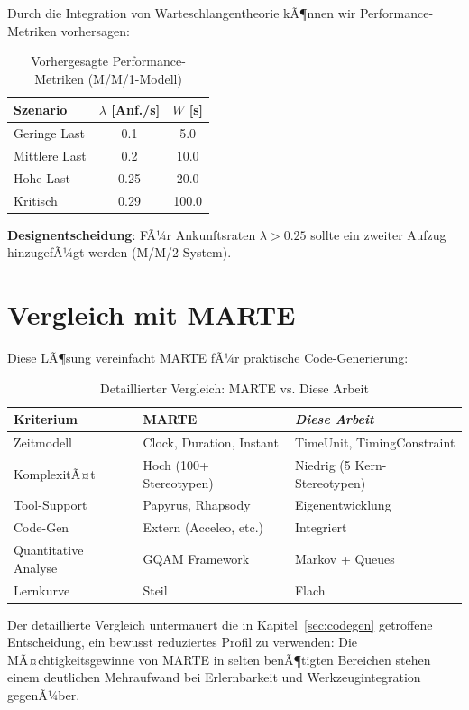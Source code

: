 ﻿\documentclass[a4paper,12pt]{report}
\theoremstyle{definition}
\begin{document}
Durch die Integration von Warteschlangentheorie kÃ¶nnen wir Performance-Metriken vorhersagen:

\begin{table}[h]
	\centering
	\begin{tabular}{@{}lcc@{}}
		\toprule
		\textbf{Szenario} & \textbf{$\lambda$ [Anf./s]} & \textbf{$W$ [s]} \\
		\midrule
		Geringe Last & 0.1 & 5.0 \\
		Mittlere Last & 0.2 & 10.0 \\
		Hohe Last & 0.25 & 20.0 \\
		Kritisch & 0.29 & 100.0 \\
		\bottomrule
	\end{tabular}
	\caption{Vorhergesagte Performance-Metriken (M/M/1-Modell)}
	\label{tab:performance-prediction}
\end{table}

\textbf{Designentscheidung}: FÃ¼r Ankunftsraten $\lambda > 0.25$ sollte ein zweiter Aufzug hinzugefÃ¼gt werden (M/M/2-System).

\section{Vergleich mit MARTE}

Diese LÃ¶sung vereinfacht MARTE fÃ¼r praktische Code-Generierung:

\begin{table}[h]
	\centering
	\begin{tabular}{@{}lll@{}}
		\toprule
		\textbf{Kriterium} & \textbf{MARTE} & \textbf{\textit{Diese Arbeit}} \\
		\midrule
		Zeitmodell & Clock, Duration, Instant & TimeUnit, TimingConstraint \\
		KomplexitÃ¤t & Hoch (100+ Stereotypen) & Niedrig (5 Kern-Stereotypen) \\
		Tool-Support & Papyrus, Rhapsody & Eigenentwicklung \\
		Code-Gen & Extern (Acceleo, etc.) & Integriert \\
		Quantitative Analyse & GQAM Framework & Markov + Queues \\
		Lernkurve & Steil & Flach \\
		\bottomrule
	\end{tabular}
	\caption{Detaillierter Vergleich: MARTE vs. Diese Arbeit}
\label{tab:marte-detail}
	\label{tab:marte-detailed}
\end{table}

Der detaillierte Vergleich untermauert die in Kapitel~\ref{sec:codegen} getroffene Entscheidung, ein bewusst reduziertes Profil zu verwenden: Die MÃ¤chtigkeitsgewinne von MARTE in selten benÃ¶tigten Bereichen stehen einem deutlichen Mehraufwand bei Erlernbarkeit und Werkzeugintegration gegenÃ¼ber.
\end{document}
